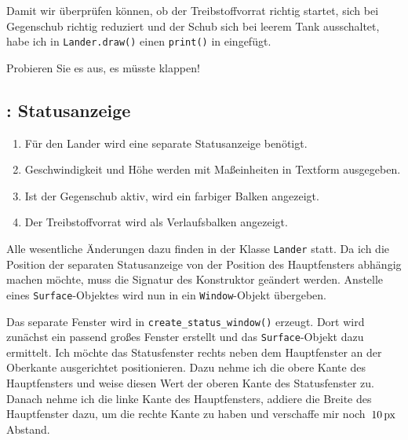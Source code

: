 
Damit wir überprüfen können, ob der Treibstoffvorrat richtig startet, sich bei Gegenschub richtig reduziert und der Schub sich bei leerem Tank ausschaltet, habe ich in \texttt{Lander.draw()} einen \texttt{print()} in  eingefügt.


Probieren Sie es aus, es müsste klappen!


\subsection{: Statusanzeige}

\begin{enumerate}
	\item Für den Lander wird eine separate Statusanzeige benötigt.\label{reqStatusWindow}
	\item Geschwindigkeit und Höhe werden mit Maßeinheiten in Textform ausgegeben.\label{reqStatusGH}
	\item Ist der Gegenschub aktiv, wird ein farbiger Balken angezeigt.\label{reqStatusSchub}
	\item Der Treibstoffvorrat wird als Verlaufsbalken angezeigt.\label{reqStatusTreibstoff}
\end{enumerate}
\er

Alle wesentliche Änderungen dazu finden in der Klasse \texttt{Lander} statt. Da ich die Position der separaten Statusanzeige von der Position des Hauptfensters abhängig machen möchte, muss die Signatur des Konstruktor geändert werden. Anstelle eines \texttt{Surface}-Objektes wird nun in  ein \texttt{Window}-Objekt übergeben. 


Das separate Fenster wird in \texttt{create\_status\_window()} erzeugt. Dort wird zunächst ein passend großes Fenster erstellt und das \texttt{Surface}-Objekt dazu ermittelt. Ich möchte das Statusfenster rechts neben dem Hauptfenster an der Oberkante ausgerichtet positionieren. Dazu nehme ich die obere Kante des Hauptfensters und weise diesen Wert der oberen Kante des Statusfenster zu. Danach nehme ich die linke Kante des Hauptfensters, addiere die Breite des Hauptfenster dazu, um die rechte Kante zu haben und verschaffe mir noch~$\unit[10]{px}$ Abstand.

